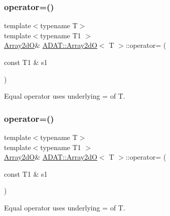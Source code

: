 \mbox{\label{classADAT_1_1Array2dO_a82bf731b5d6edfc53b941b5815647a6e}} 
\subsubsection{\texorpdfstring{operator=()}{operator=()}\hspace{0.1cm}{\footnotesize\ttfamily [4/6]}}
{\footnotesize\ttfamily template$<$typename T$>$ \\
template$<$typename T1 $>$ \\
\mbox{\hyperlink{classADAT_1_1Array2dO}{Array2dO}}\& \mbox{\hyperlink{classADAT_1_1Array2dO}{A\+D\+A\+T\+::\+Array2dO}}$<$ T $>$\+::operator= (\begin{DoxyParamCaption}\item[{const T1 \&}]{s1 }\end{DoxyParamCaption})\hspace{0.3cm}{\ttfamily [inline]}}



Equal operator uses underlying = of T. 

\mbox{\label{classADAT_1_1Array2dO_a82bf731b5d6edfc53b941b5815647a6e}} 
\subsubsection{\texorpdfstring{operator=()}{operator=()}\hspace{0.1cm}{\footnotesize\ttfamily [5/6]}}
{\footnotesize\ttfamily template$<$typename T$>$ \\
template$<$typename T1 $>$ \\
\mbox{\hyperlink{classADAT_1_1Array2dO}{Array2dO}}\& \mbox{\hyperlink{classADAT_1_1Array2dO}{A\+D\+A\+T\+::\+Array2dO}}$<$ T $>$\+::operator= (\begin{DoxyParamCaption}\item[{const T1 \&}]{s1 }\end{DoxyParamCaption})\hspace{0.3cm}{\ttfamily [inline]}}



Equal operator uses underlying = of T. 

